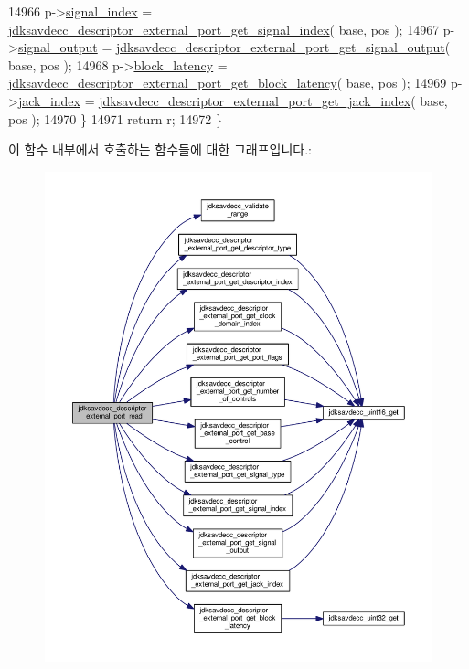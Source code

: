 \begin{DoxyCode}
14966         p->\hyperlink{structjdksavdecc__descriptor__external__port_ae2e81a95ee9ad83f1fe22b6a1ee29075}{signal\_index} = 
      \hyperlink{group__descriptor__external__port_ga8c14b30ec5110025834900b1fcb605a9}{jdksavdecc\_descriptor\_external\_port\_get\_signal\_index}( 
      base, pos );
14967         p->\hyperlink{structjdksavdecc__descriptor__external__port_ab4b91864e6fc335d7e86536d9f4461e4}{signal\_output} = 
      \hyperlink{group__descriptor__external__port_ga725cdcf03a9131a8512188721524c52c}{jdksavdecc\_descriptor\_external\_port\_get\_signal\_output}(
       base, pos );
14968         p->\hyperlink{structjdksavdecc__descriptor__external__port_ae2e9f0088d5e900b610d1b2818dfc559}{block\_latency} = 
      \hyperlink{group__descriptor__external__port_ga12e301300dd4da726c3327f8a28538a9}{jdksavdecc\_descriptor\_external\_port\_get\_block\_latency}(
       base, pos );
14969         p->\hyperlink{structjdksavdecc__descriptor__external__port_ab21cbae1a33ecc3062208bee181c262f}{jack\_index} = 
      \hyperlink{group__descriptor__external__port_ga9c5497dbe91aa7afbc59560bb3cb6fb9}{jdksavdecc\_descriptor\_external\_port\_get\_jack\_index}( base,
       pos );
14970     \}
14971     \textcolor{keywordflow}{return} r;
14972 \}
\end{DoxyCode}


이 함수 내부에서 호출하는 함수들에 대한 그래프입니다.\+:
\nopagebreak
\begin{figure}[H]
\begin{center}
\leavevmode
\includegraphics[width=350pt]{group__descriptor__external__port_gaadc9ebe37e1206ae38d998806f8e3365_cgraph}
\end{center}
\end{figure}




